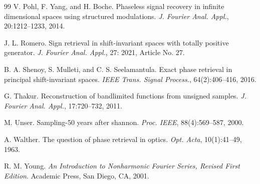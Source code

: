 \documentclass[12pt,oneside,reqno]{amsart}
\numberwithin{equation}{section}
\begin{document}
\begin{thebibliography}{99}
	V. Pohl, F. Yang, and H. Boche. Phaseless signal recovery in infinite dimensional spaces using structured modulations. \emph{J. Fourier Anal. Appl.}, 20:1212--1233, 2014.
	
	J. L. Romero. Sign retrieval in shift-invariant spaces with totally positive generator. \emph{J. Fourier Anal. Appl.}, 27: 2021, Article No. 27.
	
	B. A. Shenoy, S. Mulleti, and C. S. Seelamantula. Exact phase retrieval in principal shift-invariant spaces. \emph{IEEE Trans. Signal Process.}, 64(2):406--416, 2016.
	
	G. Thakur. Reconstruction of bandlimited functions from unsigned samples. \emph{J. Fourier Anal. Appl.}, 17:720--732, 2011.
	
	M. Unser. Sampling-50 years after shannon. \emph{Proc. IEEE}, 88(4):569--587, 2000.
	
	A. Walther. The question of phase retrieval in optics. \emph{Opt. Acta}, 10(1):41--49, 1963.
	
	
	R. M. Young. \emph{An Introduction to Nonharmonic Fourier Series, Revised First Edition}. Academic Press, San Diego, CA, 2001.
	
	
	
	
	
\end{thebibliography}
\end{document}
